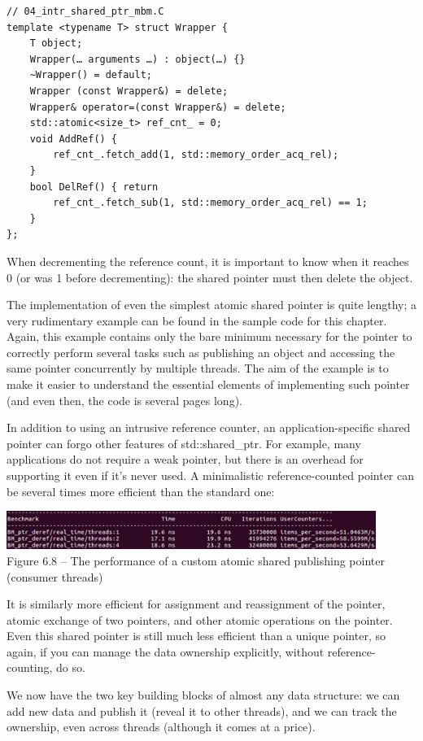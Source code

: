 \begin{lstlisting}[style=styleCXX]
// 04_intr_shared_ptr_mbm.C
template <typename T> struct Wrapper {
	T object;
	Wrapper(… arguments …) : object(…) {}
	~Wrapper() = default;
	Wrapper (const Wrapper&) = delete;
	Wrapper& operator=(const Wrapper&) = delete;
	std::atomic<size_t> ref_cnt_ = 0;
	void AddRef() {
		ref_cnt_.fetch_add(1, std::memory_order_acq_rel);
	}
	bool DelRef() { return
		ref_cnt_.fetch_sub(1, std::memory_order_acq_rel) == 1;
	}
};
\end{lstlisting}

When decrementing the reference count, it is important to know when it reaches 0 (or was 1 before decrementing): the shared pointer must then delete the object.

The implementation of even the simplest atomic shared pointer is quite lengthy; a very rudimentary example can be found in the sample code for this chapter. Again, this example contains only the bare minimum necessary for the pointer to correctly perform several tasks such as publishing an object and accessing the same pointer concurrently by multiple threads. The aim of the example is to make it easier to understand the essential elements of implementing such pointer (and even then, the code is several pages long).

In addition to using an intrusive reference counter, an application-specific shared pointer can forgo other features of std::shared\_ptr. For example, many applications do not require a weak pointer, but there is an overhead for supporting it even if it's never used. A minimalistic reference-counted pointer can be several times more efficient than the standard one:

\begin{center}
\includegraphics[width=0.9\textwidth]{content/2/chapter6/images/8.jpg}\\
Figure 6.8 – The performance of a custom atomic shared publishing pointer (consumer threads)
\end{center}

It is similarly more efficient for assignment and reassignment of the pointer, atomic exchange of two pointers, and other atomic operations on the pointer. Even this shared pointer is still much less efficient than a unique pointer, so again, if you can manage the data ownership explicitly, without reference-counting, do so.

We now have the two key building blocks of almost any data structure: we can add new data and publish it (reveal it to other threads), and we can track the ownership, even across threads (although it comes at a price).




















